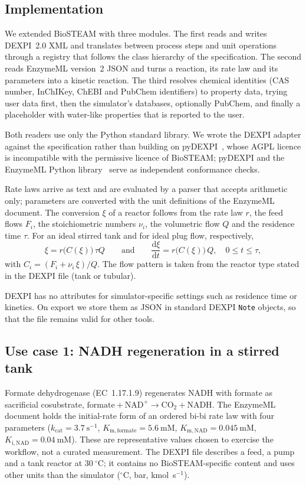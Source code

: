 \documentclass[preprint,12pt]{elsarticle}
\begin{document}
\subsection{Implementation}

We extended BioSTEAM with three modules. The first reads and writes
DEXPI~2.0 XML and translates between process steps and unit operations
through a registry that follows the class hierarchy of the specification.
The second reads EnzymeML version~2 JSON and turns a reaction, its rate law
and its parameters into a kinetic reaction. The third resolves chemical
identities (CAS number, InChIKey, ChEBI and PubChem identifiers) to
property data, trying user data first, then the simulator's databases,
optionally PubChem, and finally a placeholder with water-like properties
that is reported to the user.

Both readers use only the Python standard library. We wrote the DEXPI
adapter against the specification rather than building on
pyDEXPI~\cite{pydexpi}, whose AGPL licence is incompatible with the
permissive licence of BioSTEAM; pyDEXPI and the EnzymeML Python
library~\cite{pyenzyme} serve as independent conformance checks.

Rate laws arrive as text and are evaluated by a parser that accepts
arithmetic only; parameters are converted with the unit definitions of the
EnzymeML document. The conversion $\xi$ of a reactor follows from the rate
law $r$, the feed flows $F_i$, the stoichiometric numbers $\nu_i$, the
volumetric flow $Q$ and the residence time $\tau$. For an ideal stirred
tank and for ideal plug flow, respectively,
\begin{equation}
  \xi = r\bigl(C(\xi)\bigr)\,\tau Q
  \qquad\text{and}\qquad
  \frac{\mathrm{d}\xi}{\mathrm{d}t} = r\bigl(C(\xi)\bigr)\,Q,\quad
  0 \le t \le \tau,
\end{equation}
with $C_i = (F_i + \nu_i\,\xi)/Q$. The flow pattern is taken from the
reactor type stated in the DEXPI file (tank or tubular).

DEXPI has no attributes for simulator-specific settings such as residence
time or kinetics. On export we store them as JSON in standard DEXPI
\texttt{Note} objects, so that the file remains valid for other tools.

\subsection{Use case 1: NADH regeneration in a stirred tank}

Formate dehydrogenase (EC~1.17.1.9) regenerates NADH with formate as
sacrificial cosubstrate,
$\text{formate} + \text{NAD}^+ \rightarrow \text{CO}_2 + \text{NADH}$.
The EnzymeML document holds the initial-rate form of an ordered bi-bi rate
law with four parameters
($k_\mathrm{cat} = 3.7~\mathrm{s^{-1}}$,
$K_{\mathrm{m,formate}} = 5.6~\mathrm{mM}$,
$K_{\mathrm{m,NAD}} = 0.045~\mathrm{mM}$,
$K_{\mathrm{i,NAD}} = 0.04~\mathrm{mM}$). These are representative values
chosen to exercise the workflow, not a curated measurement. The DEXPI file
describes a feed, a pump and a tank reactor at $30~^{\circ}\mathrm{C}$; it
contains no BioSTEAM-specific content and uses other units than the
simulator ($^{\circ}$C, bar, kmol~s$^{-1}$).
\end{document}
